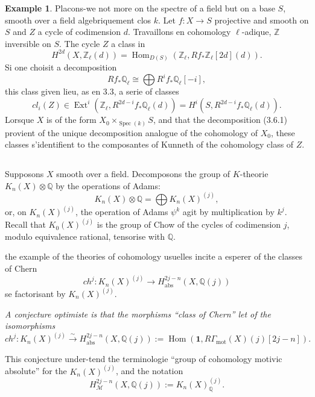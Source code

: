\documentclass[11pt,a4paper]{article}
\theoremstyle{plain}
\theoremstyle{definition}
\newtheorem{example}[theorem]{Example}
\DeclareMathOperator{\Ext}{Ext}
\DeclareMathOperator{\Hom}{Hom}
\DeclareMathOperator{\Spec}{Spec}
\newcommand{\Q}{\mathbb{Q}}
\newcommand{\Z}{\mathbb{Z}}
\DeclareMathOperator{\mot}{mot}
\newcommand{\abs}{\mathrm{abs}}
\begin{document}
\begin{example}
Placons-we not more on the spectre of a field but on a base $S$, smooth over a field algebriquement clos $k$. Let $f: X \to S$ projective and smooth on $S$ and $Z$ a cycle of codimension $d$. Travaillons en cohomology $\ell$-adique, $\Z$ inversible on $S$. The cycle $Z$ a class in
$$
H^{2d}(X, \Z_\ell(d)) = \Hom_{D(S)}(\Z_\ell, Rf_* \Z_\ell[2d](d)).
$$
Si one choisit a decomposition
\begin{equation}
\tag{3.6.1}
Rf_* \Q_\ell \cong \bigoplus R^i f_* \Q_\ell[-i],
\end{equation}
this class given lieu, as en 3.3, a serie of classes
\begin{equation}
\tag{3.6.2}
cl_i(Z) \in \Ext^i(\Z_\ell, R^{2d-i} f_* \Q_\ell(d)) = H^i(S, R^{2d-i} f_* \Q_\ell(d)).
\end{equation}
Lorsque $X$ is of the form $X_0 \times_{\Spec(k)} S$, and that the decomposition (3.6.1) provient of the unique decomposition analogue of the cohomology of $X_0$, these classes s'identifient to the composantes of Kunneth of the cohomology class of $Z$.
\end{example}

\subsection{}

Supposons $X$ smooth over a field. Decomposons the group of $K$-theorie $K_n(X) \otimes \Q$ by the operations of Adams:
$$
K_n(X) \otimes \Q = \bigoplus K_n(X)^{(j)},
$$
or, on $K_n(X)^{(j)}$, the operation of Adams $\psi^k$ agit by multiplication by $k^j$. Recall that $K_0(X)^{(j)}$ is the group of Chow of the cycles of codimension $j$, modulo equivalence rational, tensorise with $\Q$.

the example of the theories of cohomology usuelles incite a esperer of the classes of Chern
$$
ch^j: K_n(X)^{(j)} \to H^{2j-n}_{\abs}(X, \Q(j))
$$
se factorisant by $K_n(X)^{(j)}$.

\textit{A conjecture optimiste is that the morphisms ``class of Chern'' let of the isomorphisms}
\begin{equation}
\tag{3.7.1}
ch^j: K_n(X)^{(j)} \xrightarrow{\sim} H^{2j-n}_{\abs}(X, \Q(j)) := \Hom(\mathbf{1}, R\Gamma_{\mot}(X)(j)[2j-n]).
\end{equation}

This conjecture under-tend the terminologie ``group of cohomology motivic absolute'' for the $K_n(X)^{(j)}$, and the notation
$$
H^{2j-n}_{\mathcal{M}}(X, \Q(j)) := K_n(X)^{(j)}_{\Q}.$$
\end{document}

